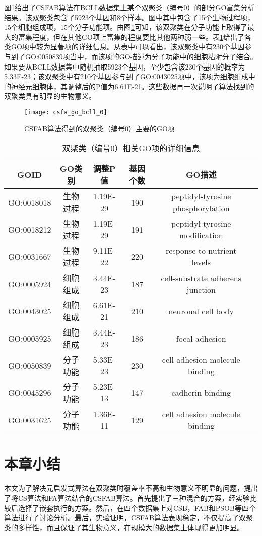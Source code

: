     图\ref{fig:csfa_go_bcll}给出了CSFAB算法在BCLL数据集上某个双聚类（编号0）的部分GO富集分析结果。该双聚类包含了5923个基因和8个样本。图中其中包含了15个生物过程项，15个细胞组成项，15个分子功能项。由图\ref{fig:csfa_go_bcll}可知，该双聚类在分子功能上取得了最大的富集程度，但在其他GO项上富集的程度要比其他两种弱一些。表\ref{tab:go_term_0}给出了各类GO项中较为显著项的详细信息。从表中可以看出，该双聚类中有230个基因参与到了GO:0050839项当中，而该项的GO描述为分子功能中的细胞粘附分子结合。如果要从BCLL数据集中随机抽取5923个基因，至少包含该230个基因的概率为5.33E-23；该双聚类中有210个基因参与到了GO:0043025项中，该项为细胞组成中的神经元细胞体，其调整后的P值为6.61E-21。这些数据再一次说明了算法找到的双聚类具有明显的生物意义。
    \begin{figure}[htbp]
        \centering
        \texttt{[image: csfa\_go\_bcll\_0]}
        \caption{CSFAB算法得到的双聚类（编号0）主要的GO项}
        \label{fig:csfa_go_bcll}
    \end{figure}

    \begin{table}[htbp]
        \caption{双聚类（编号0）相关GO项的详细信息}\label{tab:go_term_0}
        \vspace{0.5em}\centering\wuhao
        \begin{tabular}{cccccc}
        \toprule[1.5pt]
        GOID & GO类别 &调整P值 &  基因个数 & GO描述\\
        \midrule[1pt]
        GO:0018018  &生物过程 &1.19E-29& 190& peptidyl-tyrosine phosphorylation\\
        GO:0018212  &生物过程 &1.19E-29& 191& peptidyl-tyrosine modification\\
        GO:0031667  &生物过程 &9.11E-22& 220& response to nutrient levels\\
        GO:0005924  &细胞组成 &3.44E-23& 187& cell-substrate adherens junction\\
        GO:0043025  &细胞组成 &6.61E-21& 210& neuronal cell body\\
        GO:0005925  &细胞组成 &3.44E-23& 186& focal adhesion\\
        GO:0050839  &分子功能 &5.33E-23& 230& cell adhesion molecule binding \\
        GO:0045296  &分子功能 &5.23E-13& 147& cadherin binding\\
        GO:0031625  &分子功能 &1.36E-11& 129& cell adhesion molecule binding \\
        \bottomrule[1.5pt]
        \end{tabular}
    \end{table}

\section{本章小结}
本文为了解决元启发式算法在双聚类时覆盖率不高和生物意义不明显的问题，提出了将CS算法和FA算法结合的CSFAB算法。首先提出了三种混合的方案，经实验比较后选择了嵌套执行的方案。然后，在四个数据集上对CSB，FAB和PSOB等四个算法进行了讨论分析。最后，实验证明，CSFAB算法表现稳定，不仅提高了双聚类的多样性，而且保证了其生物意义，在规模大的数据集上体现得更加明显。
